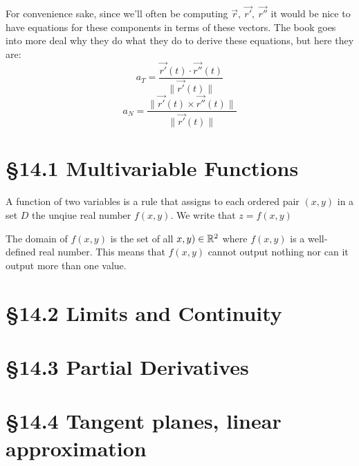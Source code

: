 \documentclass[12 pt]{article}
\begin{document}
        For convenience sake, since we'll often be computing $\vec{r},\ \vec{r'},\ \vec{r''}$ it would be nice to have equations for these components in terms of these vectors. The book goes into more deal why they do what they do to derive these equations, but here they are:
        $$a_T=\frac{\vec{r'}(t)\cdot\vec{r''}(t)}{\parallel\vec{r'}(t)\parallel}$$
        $$a_N=\frac{\parallel\vec{r'}(t)\times\vec{r''}(t)\parallel}{\parallel\vec{r'}(t)\parallel}$$
    \section{\S 14.1 Multivariable Functions}
        \begin{def*}
            A function of two variables is a rule that assigns to each ordered pair $(x,y)$ in a set $D$ the unqiue real number $f(x,y)$. We write that $z=f(x,y)$
        \end{def*}
        The domain of $f(x,y)$ is the set of all $x,y)\in\mathbb{R}^2$ where $f(x,y)$ is a well-defined real number. This means that $f(x,y)$ cannot output nothing nor can it output more than one value.
    \section{\S 14.2 Limits and Continuity}
    \section{\S 14.3 Partial Derivatives}
    \section{\S 14.4 Tangent planes, linear approximation}
\end{document}

